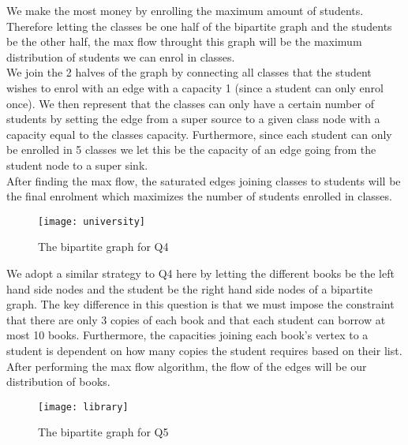\documentclass[12pt]{article}
\newenvironment{problem}[2][Problem]{\begin{trivlist}
\item[\hskip \labelsep {\bfseries #1}\hskip \labelsep {\bfseries #2.}]}{\end{trivlist}}
\begin{document}
\begin{problem}{4: Maximize the amount of students able to attend classes}

We make the most money by enrolling the maximum amount of students. Therefore letting the classes be one half of the bipartite graph and the students be the other half, the max flow throught this graph will be the maximum distribution of students we can enrol in classes.\\

We join the 2 halves of the graph by connecting all classes that the student wishes to enrol with an edge with a capacity 1 (since a student can only enrol once). We then represent that the classes can only have a certain number of students by setting the edge from a super source to a given class node with a capacity equal to the classes capacity. Furthermore, since each student can only be enrolled in 5 classes we let this be the capacity of an edge going from the student node to a super sink.\\

After finding the max flow, the saturated edges joining classes to students will be the final enrolment which maximizes the number of students enrolled in classes.
\begin{figure}[H]
 \centering
  \texttt{[image: university]}
  \caption{The bipartite graph for Q4}
\end{figure}


\end{problem}

\begin{problem}{5: The books and students form 2 sides of a bipartite graph}
We adopt a similar strategy to Q4 here by letting the different books be the left hand side nodes and the student be the right hand side nodes of a bipartite graph. The key difference in this question is that we must impose the constraint that there are only 3 copies of each book and that each student can borrow at most 10 books. Furthermore, the capacities joining each book's vertex to a student is dependent on how many copies the student requires based on their list. After performing the max flow algorithm, the flow of the edges will be our distribution of books.

\begin{figure}[H]
 \centering
  \texttt{[image: library]}
  \caption{The bipartite graph for Q5}
\end{figure}


\end{problem}
\end{document}
